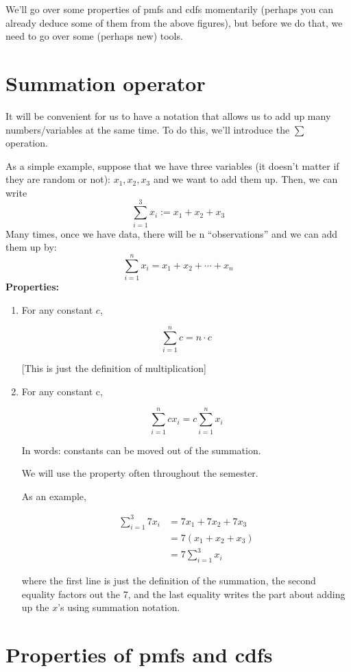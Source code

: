 \documentclass[
  letterpaper,
  DIV=11,
  numbers=noendperiod]{scrreprt}
\begin{document}
We'll go over some properties of pmfs and cdfs momentarily (perhaps you
can already deduce some of them from the above figures), but before we
do that, we need to go over some (perhaps new) tools.

\section{Summation operator}\label{summation-operator}

It will be convenient for us to have a notation that allows us to add up
many numbers/variables at the same time. To do this, we'll introduce the
\(\sum\) operation.

As a simple example, suppose that we have three variables (it doesn't
matter if they are random or not): \(x_1,x_2,x_3\) and we want to add
them up. Then, we can write \[
  \sum_{i=1}^3 x_i := x_1 + x_2 + x_3
\] Many times, once we have data, there will be n ``observations'' and
we can add them up by: \[
  \sum_{i=1}^n x_i = x_1 + x_2 + \cdots + x_n
\] \textbf{Properties:}

\begin{enumerate}
\def\labelenumi{\arabic{enumi}.}
\item
  For any constant \(c\),

  \[
   \sum_{i=1}^n c = n \cdot c
   \]

  {[}This is just the definition of multiplication{]}
\item
  For any constant c,

  \[
     \sum_{i=1}^n c x_i = c \sum_{i=1}^n x_i
   \]

  In words: constants can be moved out of the summation.

  We will use the property often throughout the semester.

  As an example,

  \[
     \begin{aligned}
     \sum_{i=1}^3 7 x_i &= 7x_1 + 7x_2 + 7x_3 \\
     &= 7(x_1 + x_2 + x_3) \\
     &= 7 \sum_{i=1}^3 x_i
     \end{aligned}
   \]

  where the first line is just the definition of the summation, the
  second equality factors out the 7, and the last equality writes the
  part about adding up the \(x\)'s using summation notation.
\end{enumerate}

\section{Properties of pmfs and cdfs}\label{properties-of-pmfs-and-cdfs}
\end{document}
